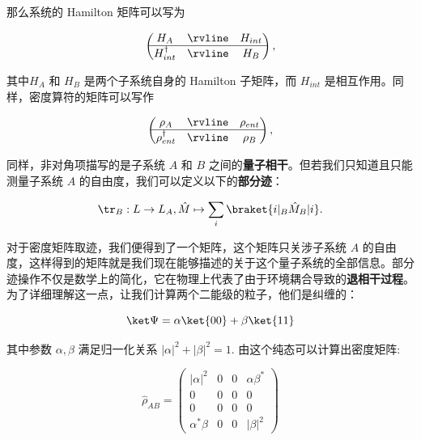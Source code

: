那么系统的 Hamilton 矩阵可以写为
\begin{linenomath}\begin{equation}
\begin{pmatrix}
  H_A
  & \rvline & H_{int} \\
\hline
  H_{int}^\dagger & \rvline &
  H_B
\end{pmatrix},
\end{equation}\end{linenomath}
其中$H_A$ 和 $H_B$ 是两个子系统自身的 Hamilton 子矩阵，而 $H_{int}$ 是相互作用。同样，密度算符的矩阵可以写作
\begin{linenomath}\begin{equation}
\begin{pmatrix}
  \rho_A
  & \rvline & \rho_{ent} \\
\hline
  \rho_{ent}^\dagger & \rvline &
  \rho_B
\end{pmatrix},
\end{equation}\end{linenomath}
同样，非对角项描写的是子系统 $A$ 和 $B$ 之间的\textbf{量子相干}。但若我们只知道且只能测量子系统 $A$ 的自由度，我们可以定义以下的\textbf{部分迹}：
\begin{linenomath}\begin{equation}
\tr_B: L\to L_A, \hat{M} \mapsto \sum_{i} \braket{i|_B\hat{M}_B|i}.
\end{equation}\end{linenomath}
对于密度矩阵取迹，我们便得到了一个矩阵，这个矩阵只关涉子系统 $A$ 的自由度，这样得到的矩阵就是我们现在能够描述的关于这个量子系统的全部信息。部分迹操作不仅是数学上的简化，它在物理上代表了由于环境耦合导致的\textbf{退相干过程}。为了详细理解这一点，让我们计算两个二能级的粒子，他们是纠缠的：
\begin{linenomath}\begin{equation}
\ket\Psi = \alpha\ket{00}+\beta\ket{11}
\end{equation}\end{linenomath}
其中参数 $\alpha,\beta$ 满足归一化关系 $|\alpha|^2+|\beta|^2 = 1.$
由这个纯态可以计算出密度矩阵:
\begin{linenomath}\begin{equation}
 \hat{\rho }_{AB} = \left( \begin{matrix} {\left| \alpha \right| }^{2} & 0 & 0 & \alpha {\beta }^{ * } \\  0 & 0 & 0 & 0 \\  0 & 0 & 0 & 0 \\  {\alpha }^{ * }\beta & 0 & 0 & {\left| \beta \right| }^{2} \end{matrix}\right) 
\end{equation}\end{linenomath}
